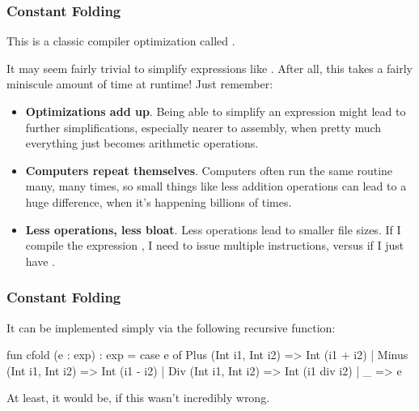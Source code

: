 \documentclass[aspectratio=169]{beamer}
\begin{document}
\begin{frame}[fragile]
  \frametitle{Constant Folding}

  This is a classic compiler optimization called .

  \vspace{\fill}


  \vspace{\fill}

  It may seem fairly trivial to simplify expressions like . After
  all, this takes a fairly miniscule amount of time at runtime! Just remember:
  \begin{itemize}
    \item \textbf{Optimizations add up}. Being able to simplify an expression
    might lead to further simplifications, especially nearer to
    assembly, when pretty much everything just becomes arithmetic operations.
    \item \textbf{Computers repeat themselves}. Computers often run the same routine many, many times, so small
    things like less addition operations can lead to a huge difference, when
    it's happening billions of times.
    \item \textbf{Less operations, less bloat}. Less operations lead to smaller file
    sizes. If I compile the expression , I need to issue multiple
    instructions, versus if I just have .
  \end{itemize}
\end{frame}

\begin{frame}[fragile]
  \frametitle{Constant Folding}

  It can be implemented simply via the following recursive function:

  {\small
  \begin{codeblock}
    fun cfold (e : exp) : exp =
      case e of
        Plus  (Int i1, Int i2) => Int (i1 + i2)
      | Minus (Int i1, Int i2) => Int (i1 - i2)
      | Div   (Int i1, Int i2) => Int (i1 div i2)
      | _ => e
  \end{codeblock}
  }

  \vspace{\fill}

  At least, it would be, if this wasn't incredibly wrong.
\end{frame}
\end{document}
